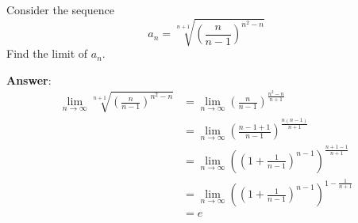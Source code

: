 \begin{exm}\label{exm-sequence-limit:1}
	Consider the sequence
	\begin{equation*}
		a_n=\sqrt[n+1]{\left(\frac{n}{n-1}\right)^{n^2-n}}
	\end{equation*}
	Find the limit of $a_n$.
	\begin{flushleft}
		\textbf{Answer}:
		\begin{align*}
			\lim_{n\to\infty}\sqrt[n+1]{\left(\frac{n}{n-1}\right)^{n^2-n}}
			 & =\lim_{n\to\infty}\left(\frac{n}{n-1}\right)^{\frac{n^2-n}{n+1}}                      \\
			 & =\lim_{n\to\infty}\left(\frac{n-1+1}{n-1}\right)^{\frac{n(n-1)}{n+1}}                 \\
			 & =\lim_{n\to\infty}\left(\left(1+\frac{1}{n-1}\right)^{n-1}\right)^{\frac{n+1-1}{n+1}} \\
			 & =\lim_{n\to\infty}\left(\left(1+\frac{1}{n-1}\right)^{n-1}\right)^{1-\frac{1}{n+1}}   \\
			 & =e
		\end{align*}
	\end{flushleft}
\end{exm}

